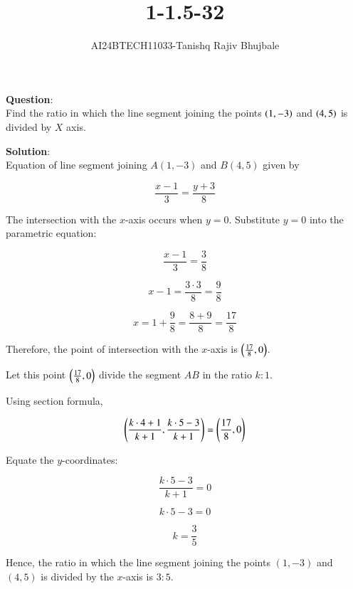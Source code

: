 \documentclass[journal]{IEEEtran}
\begin{document}

\vspace{3cm}

\title{1-1.5-32}
\author{AI24BTECH11033-Tanishq Rajiv Bhujbale}
{\let\newpage\relax\maketitle}

\renewcommand{\thefigure}{\theenumi}
\renewcommand{\thetable}{\theenumi}
\setlength{\intextsep}{10pt} %


\renewcommand{\thetable}{\theenumi}


\textbf{Question}:\\
Find the ratio in which the line segment joining the points $\left(1,-3\right)$ and $\left(4, 5\right)$ is divided by $X$ axis.


\textbf{Solution}:\\


Equation of line segment joining $A(1,-3)$ and $B(4,5)$ given by

   $$\frac{x-1}{3}=\frac{y+3}{8}$$

   The intersection with the $x$-axis occurs when $y=0$. Substitute $y=0$ into the parametric equation:

   $$\frac{x-1}{3}=\frac{3}{8}$$

   $$x-1=\frac{3 \cdot 3}{8}=\frac{9}{8}$$

   $$x=1+\frac{9}{8}=\frac{8+9}{8}=\frac{17}{8}$$

   Therefore, the point of intersection with the $x$-axis is $\left(\frac{17}{8}, 0\right)$.

   Let this point $\left(\frac{17}{8},0\right)$ divide the segment $AB$ in the ratio $k:1$. 
   
   Using section formula, 

   $$\left(\frac{k \cdot 4+1}{k+1},\frac{k \cdot 5-3}{k+1}\right)=\left(\frac{17}{8},0\right)$$

   Equate the $y$-coordinates:

   $$\frac{k \cdot 5-3}{k+1}=0$$

   $$k \cdot 5-3=0$$

   $$k=\frac{3}{5}$$

   Hence, the ratio in which the line segment joining the points $(1,-3)$ and $(4,5)$ is divided by the $x$-axis is $3:5$.
\end{document}
